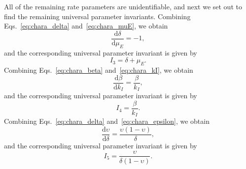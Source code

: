 \documentclass[12pt]{article}
\begin{document}
All of the remaining rate parameters are unidentifiable, and next we set out to find the remaining universal parameter invariants. Combining Eqs.~\eqref{eq:chara_delta} and~\eqref{eq:chara_muE}, we obtain
\begin{equation}
  \frac{\mathrm{d}\delta}{\mathrm{d}\mu_{E}}=-1,
  \label{eq:chara_I3}
\end{equation}
and the corresponding universal parameter invariant is given by
\begin{equation}
  I_{3}=\delta+\mu_{E}.
  \label{eq:I3_app}
\end{equation}
Combining Eqs.~\eqref{eq:chara_beta} and~\eqref{eq:chara_kI}, we obtain
\begin{equation}
  \frac{\mathrm{d}\beta}{\mathrm{d}k_{I}}=\frac{\beta}{k_{I}},
  \label{eq:chara_I4}
\end{equation}
and the corresponding universal parameter invariant is given by
\begin{equation}
  I_{4}=\frac{\beta}{k_{I}}.
  \label{eq:I4_app}
\end{equation}
Combining Eqs.~\eqref{eq:chara_delta} and~\eqref{eq:chara_epsilon}, we obtain
\begin{equation}
  \frac{\mathrm{d}\upsilon}{\mathrm{d}\delta}=\frac{\upsilon(1-\upsilon)}{\delta},
  \label{eq:chara_I5}
\end{equation}
and the corresponding universal parameter invariant is given by
\begin{equation}
  I_{5}=\frac{\upsilon}{\delta(1-\upsilon)}.
  \label{eq:I5_app}
\end{equation}
\end{document}

